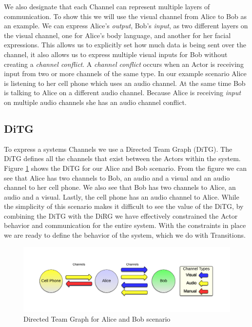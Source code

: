 We also designate that each Channel can represent multiple layers of communication.  To show this we will use the visual channel from Alice to Bob as an example.  We can express Alice's {\em output}, Bob's {\em input}, as two different layers on the visual channel, one for Alice's body language, and another for her facial expressions.  This allows us to explicitly set how much data is being sent over the channel, it also allows us to express multiple visual inputs for Bob without creating a {\em channel conflict}.  A {\em channel conflict} occurs when an Actor is receiving input from two or more channels of the same type.  In our example scenario Alice is listening to her cell phone which uses an audio channel.  At the same time Bob is talking to Alice on a different audio channel.  Because Alice is receiving {\em input} on multiple audio channels she has an audio channel conflict.  

\subsection{DiTG}
To express a systems Channels we use a Directed Team Graph (DiTG)\cite{FVHMS}.  The DiTG defines all the channels that exist between the Actors within the system.  Figure \ref{fig:ab_ditg} shows the DiTG for our Alice and Bob scenario.  From the figure we can see that Alice has two channels to Bob, an audio and a visual and an audio channel to her cell phone.  We also see that Bob has two channels to Alice, an audio and a visual.  Lastly, the cell phone has an audio channel to Alice.  While the simplicity of this scenario makes it difficult to see the value of the DiTG, by combining the DiTG with the DiRG we have effectively constrained the Actor behavior and communication for the entire system.  With the constraints in place we are ready to define the behavior of the system, which we do with Transitions.

\begin{figure}[h]
\begin{center}
\includegraphics[width=\textwidth]{ab_ditg.png}
\caption{Directed Team Graph for Alice and Bob scenario}
\label{fig:ab_ditg}
\end{center}
\end{figure}

